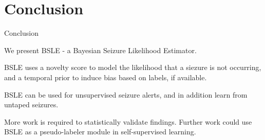 \documentclass[t]{beamer}
\theoremstyle{definition}
\begin{document}
\section{Conclusion}
\begin{frame}{Conclusion}

    \begin{block}{}
        We present BSLE - a Bayesian Seizure Likelihood Estimator.
    \end{block}
    \pause
    \begin{block}{}
        BSLE uses a novelty score to model the likelihood that a siezure is not occurring, and a temporal prior to induce bias based on labels, if available.
    \end{block}
    \pause
    \begin{block}{}
        BSLE can be used for unsupervised seizure alerts, and in addition learn from untaped seizures.
    \end{block}
    \pause
    \begin{block}{}
    More work is required to statistically validate findings. Further work could use BSLE as a pseudo-labeler module in self-supervised learning.
    \end{block}
\end{frame}
\end{document}
